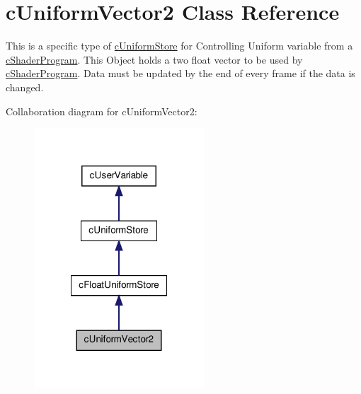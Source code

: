 \hypertarget{classc_uniform_vector2}{
\section{cUniformVector2 Class Reference}
\label{classc_uniform_vector2}
}


This is a specific type of \hyperlink{classc_uniform_store}{cUniformStore} for Controlling Uniform variable from a \hyperlink{classc_shader_program}{cShaderProgram}. This Object holds a two float vector to be used by \hyperlink{classc_shader_program}{cShaderProgram}. Data must be updated by the end of every frame if the data is changed.  




Collaboration diagram for cUniformVector2:\nopagebreak
\begin{figure}[H]
\begin{center}
\leavevmode
\includegraphics[width=180pt]{classc_uniform_vector2__coll__graph}
\end{center}
\end{figure}
